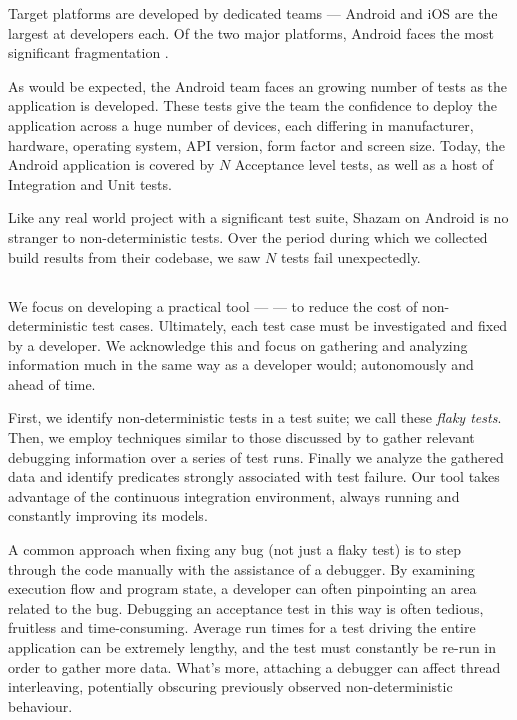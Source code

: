 Target platforms are developed by dedicated teams --- Android and iOS are the largest at  developers each. Of the two major platforms, Android faces the most significant fragmentation \cite{AndroidFragmentationVisualized}.

As would be expected, the Android team faces an growing number of tests as the application is developed.  These tests give the team the confidence to deploy the application across a huge number of devices, each differing in manufacturer, hardware, operating system, API version, form factor and screen size. Today, the Android application is covered by $N$  Acceptance level tests, as well as a host of Integration and Unit tests.

Like any real world project with a significant test suite, Shazam on Android is no stranger to non-deterministic tests. Over the period  during which we collected build results from their codebase, we saw $N$ tests fail unexpectedly.

\subsection{\splatter}

We focus on developing a practical tool --- \emph{\splatter} --- to reduce the cost of non-deterministic test cases. Ultimately, each test case must be investigated and fixed by a developer. We acknowledge this and focus on gathering and analyzing information much in the same way as a developer would; autonomously and ahead of time.

First, we identify non-deterministic tests in a test suite; we call these \textit{flaky tests}. Then, we employ techniques similar to those discussed by \citet{ArumugaNainar:2010:ABI:1806799.1806839} to gather relevant debugging information over a series of test runs. Finally we analyze the gathered data and identify predicates strongly associated with test failure. Our tool takes advantage of the continuous integration environment, always running and constantly improving its models.

A common approach when fixing any bug (not just a flaky test) is to step through the code manually with the assistance of a debugger. By examining execution flow and program state, a developer can often pinpointing an area related to the bug. Debugging an acceptance test in this way is often tedious, fruitless and time-consuming. Average run times for a test driving the entire application can be extremely lengthy, and the test must constantly be re-run in order to gather more data. What's more, attaching a debugger can affect thread interleaving, potentially obscuring previously observed non-deterministic behaviour.

